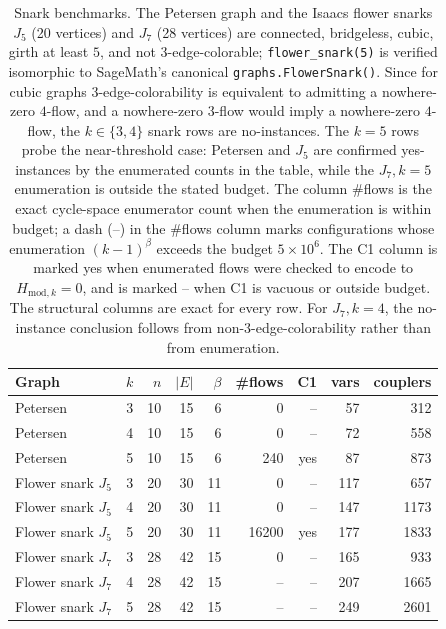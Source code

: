 \begin{table}[H]
\centering
\small
\begin{tabular}{lrrrrrrrr}
\hline
Graph & $k$ & $n$ & $|E|$ & $\beta$ & \#flows & C1 & vars & couplers \\
\hline
Petersen & 3 & 10 & 15 & 6 & 0 & -- & 57 & 312 \\
Petersen & 4 & 10 & 15 & 6 & 0 & -- & 72 & 558 \\
Petersen & 5 & 10 & 15 & 6 & 240 & yes & 87 & 873 \\
Flower snark $J_5$ & 3 & 20 & 30 & 11 & 0 & -- & 117 & 657 \\
Flower snark $J_5$ & 4 & 20 & 30 & 11 & 0 & -- & 147 & 1173 \\
Flower snark $J_5$ & 5 & 20 & 30 & 11 & 16200 & yes & 177 & 1833 \\
Flower snark $J_7$ & 3 & 28 & 42 & 15 & 0 & -- & 165 & 933 \\
Flower snark $J_7$ & 4 & 28 & 42 & 15 & -- & -- & 207 & 1665 \\
Flower snark $J_7$ & 5 & 28 & 42 & 15 & -- & -- & 249 & 2601 \\
\hline
\end{tabular}
\caption{Snark benchmarks. The Petersen graph and the Isaacs flower snarks $J_5$ (20 vertices) and $J_7$ (28 vertices) are connected, bridgeless, cubic, girth at least $5$, and not $3$-edge-colorable; \texttt{flower\_snark(5)} is verified isomorphic to SageMath's canonical \texttt{graphs.FlowerSnark()}. Since for cubic graphs $3$-edge-colorability is equivalent to admitting a nowhere-zero $4$-flow, and a nowhere-zero $3$-flow would imply a nowhere-zero $4$-flow, the $k\in\{3,4\}$ snark rows are no-instances. The $k=5$ rows probe the near-threshold case: Petersen and $J_5$ are confirmed yes-instances by the enumerated counts in the table, while the $J_7,k=5$ enumeration is outside the stated budget. The column \#flows is the exact cycle-space enumerator count when the enumeration is within budget; a dash (--) in the \#flows column marks configurations whose enumeration $(k-1)^\beta$ exceeds the budget $5\times 10^6$. The C1 column is marked yes when enumerated flows were checked to encode to $H_{\mathrm{mod},k}=0$, and is marked -- when C1 is vacuous or outside budget. The structural columns are exact for every row. For $J_7,k=4$, the no-instance conclusion follows from non-$3$-edge-colorability rather than from enumeration.}
\label{tab:snark-benchmarks}
\end{table}
